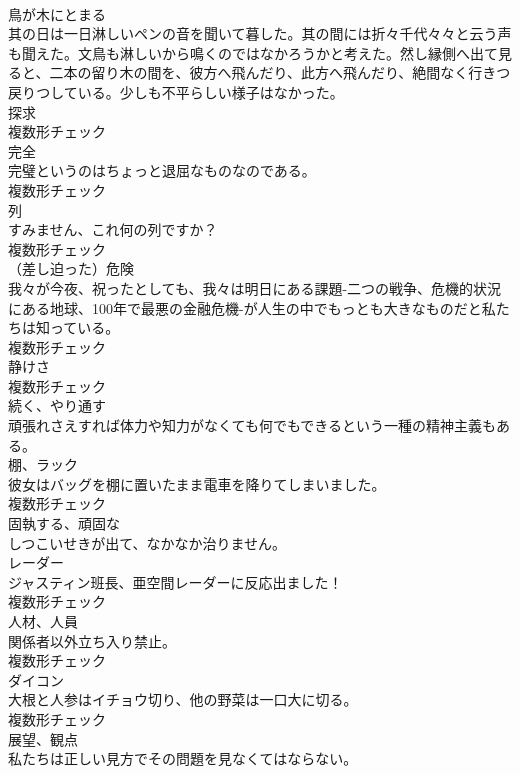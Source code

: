 \documentclass[8pt]{extreport}
\begin{document}
\begin{CJK}{UTF8}{min}
\\	[動詞]	鳥が木にとまる	
\\	其の日は一日淋しいペンの音を聞いて暮した。其の間には折々千代々々と云う声も聞えた。文鳥も淋しいから鳴くのではなかろうかと考えた。然し縁側へ出て見ると、二本の留り木の間を、彼方へ飛んだり、此方へ飛んだり、絶間なく行きつ戻りつしている。少しも不平らしい様子はなかった。	
\\	[名詞]	探求	
\\	複数形チェック
\\	[名詞]	完全	
\\	完璧というのはちょっと退屈なものなのである。	
\\	複数形チェック
\\	[名詞]	列	
\\	すみません、これ何の列ですか？	
\\	複数形チェック
\\	[名詞]	（差し迫った）危険	
\\	我々が今夜、祝ったとしても、我々は明日にある課題-二つの戦争、危機的状況にある地球、100年で最悪の金融危機-が人生の中でもっとも大きなものだと私たちは知っている。	
\\	複数形チェック
\\	[名詞]	静けさ	
\\	複数形チェック
\\	[動詞]	続く、やり通す	
\\	頑張れさえすれば体力や知力がなくても何でもできるという一種の精神主義もある。	
\\	[名詞]	棚、ラック	
\\	彼女はバッグを棚に置いたまま電車を降りてしまいました。	
\\	複数形チェック
\\	[形容詞]	固執する、頑固な	
\\	しつこいせきが出て、なかなか治りません。	
\\	[名詞]	レーダー	
\\	ジャスティン班長、亜空間レーダーに反応出ました！	
\\	複数形チェック
\\	[名詞]	人材、人員	
\\	関係者以外立ち入り禁止。	
\\	複数形チェック
\\	[名詞]	ダイコン	
\\	大根と人参はイチョウ切り、他の野菜は一口大に切る。	
\\	複数形チェック
\\	[名詞]	展望、観点	
\\	私たちは正しい見方でその問題を見なくてはならない。	

\end{CJK}
\end{document}
